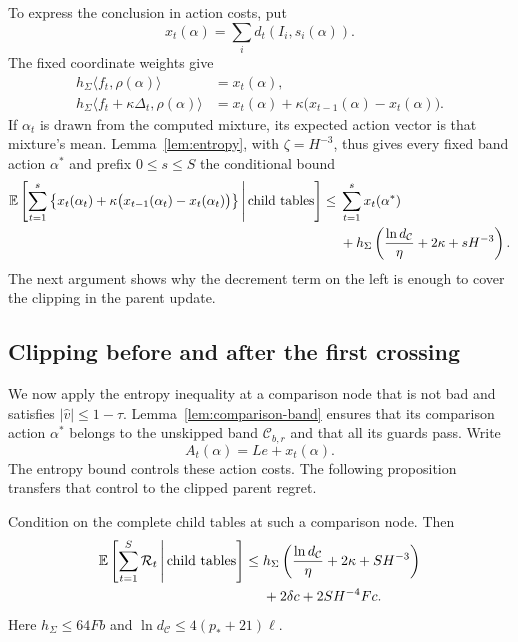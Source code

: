 To express the conclusion in action costs, put
\[
 x_t(\alpha)=\sum_i d_t(I_i,s_i(\alpha)).
\]
The fixed coordinate weights give
\[
 \begin{aligned}
 h_\Sigma\langle f_t,\rho(\alpha)\rangle&=x_t(\alpha),\\
 h_\Sigma\langle f_t+\kappa\Delta_t,\rho(\alpha)\rangle
 &=x_t(\alpha)+\kappa\bigl(x_{t-1}(\alpha)-x_t(\alpha)\bigr).
 \end{aligned}
\]
If $\alpha_t$ is drawn from the computed mixture, its expected action
vector is that mixture's mean.  Lemma~\ref{lem:entropy}, with
$\zeta=H^{-3}$, thus gives every fixed band action $\alpha^*$ and prefix
$0\le s\le S$ the conditional bound
\begin{equation}\label{eq:band-action-regret}
\begin{split}
 \mathbb E\left[\sum_{t=1}^s
   \left\{x_t(\alpha_t)
       +\kappa\bigl(x_{t-1}(\alpha_t)-x_t(\alpha_t)\bigr)\right\}
       \,\middle|\,\text{child tables}\right]
 \le{}&\sum_{t=1}^s x_t(\alpha^*)\\
 &+h_\Sigma\left(\frac{\ln d_{\mathcal C}}{\eta}
                         +2\kappa+sH^{-3}\right).
\end{split}
\end{equation}
The next argument shows why the decrement term on the left is enough
to cover the clipping in the parent update.

\subsection{Clipping before and after the first crossing}

We now apply the entropy inequality at a comparison node that is not bad
and satisfies $|\widehat v|\le1-\tau$.
Lemma~\ref{lem:comparison-band} ensures that its comparison action
$\alpha^*$ belongs to the unskipped band $\mathcal C_{b,r}$ and that
all its guards pass. Write
\[
 A_t(\alpha)=Le+x_t(\alpha).
\]
The entropy bound controls these action costs. The following proposition
transfers that control to the clipped parent regret.

\begin{proposition}\label{prop:node-regret}
Condition on the complete child tables at such a comparison node.
Then
\begin{equation}\label{eq:node-regret}
\begin{split}
 \mathbb E\left[\sum_{t=1}^S\mathcal R_t
       \,\middle|\,\text{child tables}\right]
 \le {}&h_\Sigma\left(
       \frac{\ln d_{\mathcal C}}{\eta}
       +2\kappa+SH^{-3}\right)\\
       &+2\delta c+2SH^{-4}Fc.
\end{split}
\end{equation}
Here $h_\Sigma\le64Fb$ and
$\ln d_{\mathcal C}\le4(p_*+21)\ell$.
\end{proposition}

